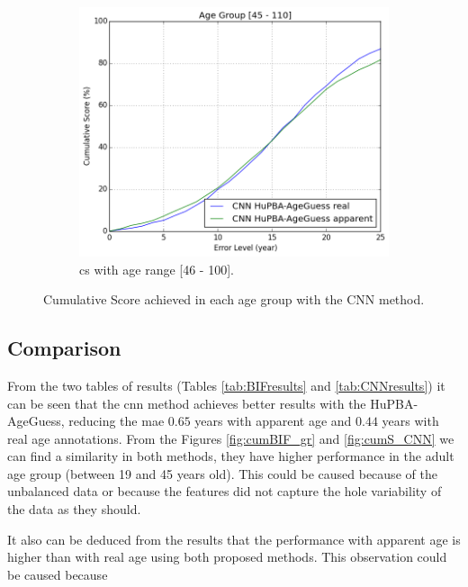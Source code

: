 \begin{figure}[!h]
	\vspace{0.5cm}
	\begin{subfigure}[b]{0.5\textwidth}
		\includegraphics[width=\textwidth]{figures/results_cnn_cum_score_good_ag2}
		\caption{\acrshort{cs} with age range [46 - 100].}
		\label{fig:cumS_CNN_ag2}
	\end{subfigure}
	\caption{Cumulative Score achieved in each age group with the CNN method.}\label{fig:cumCNN_gr}
\end{figure}

\subsection{Comparison}

From the two tables of results (Tables \ref{tab:BIFresults} and \ref{tab:CNNresults}) it can be seen that the \gls{cnn} method achieves better results with the HuPBA-AgeGuess, reducing the \gls{mae} $0.65$ years with apparent age and $0.44$ years with real age annotations. From the Figures \ref{fig:cumBIF_gr} and \ref{fig:cumS_CNN} we can find a similarity in both methods, they have higher performance in the adult age group (between 19 and 45 years old). This could be caused because of the unbalanced data or because the features did not capture the hole variability of the data as they should.

It also can be deduced from the results that the performance with apparent age is higher than with real age using both proposed methods. This observation could be caused because 


